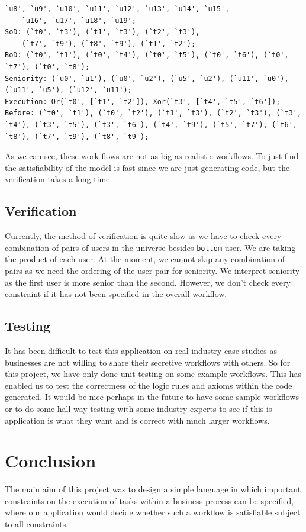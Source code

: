 \documentclass[a4paper]{report}
\begin{document}
\begin{enumerate}
\begin{lstlisting}[frame=single]
	`u8', `u9', `u10', `u11', `u12', `u13', `u14', `u15', 
	`u16', `u17', `u18', `u19'; 
SoD: (`t0', `t3'), (`t1', `t3'), (`t2', `t3'), 
	(`t7', `t9'), (`t8', `t9'), (`t1', `t2');
BoD: (`t0', `t1'), (`t0', `t4'), (`t0', `t5'), (`t0', `t6'), (`t0', `t7'), (`t0', `t8');
Seniority: (`u0', `u1'), (`u0', `u2'), (`u5', `u2'), (`u11', `u0'), (`u11', `u5'), (`u12', `u11');
Execution: Or(`t0', [`t1', `t2']), Xor(`t3', [`t4', `t5', `t6']); 
Before: (`t0', `t1'), (`t0', `t2'), (`t1', `t3'), (`t2', `t3'), (`t3', `t4'), (`t3', `t5'), (`t3', `t6'), (`t4', `t9'), (`t5', `t7'), (`t6', `t8'), (`t7', `t9'), (`t8', `t9');
\end{lstlisting}
\end{enumerate}

As we can see, these work flows are not as big as realistic workflows. To just find the satisfiability of the model is fast since we are just generating code, but the verification takes a long time. \\

\section{Verification}
Currently, the method of verification is quite slow as we have to check every combination of pairs of users in the universe besides \texttt{bottom} user. We are taking the product of each user. At the moment, we cannot skip any combination of pairs as we need the ordering of the user pair for seniority. We interpret seniority as the first user is more senior than the second. However, we don't check every constraint if it has not been specified in the overall workflow.\\

\section{Testing}
It has been difficult to test this application on real industry case studies as businesses are not willing to share their secretive workflows with others. So for this project, we have only done unit testing on some example workflows. This has enabled us to test the correctness of the logic rules and axioms within the code generated. It would be nice perhaps in the future to have some sample workflows or to do some hall way testing with some industry experts to see if this is application is what they want and is correct with much larger workflows.\\

\chapter{Conclusion}
The main aim of this project was to design a simple language in which important constraints on the execution of tasks within a business process can be specified, where our application would decide whether such a workflow is satisfiable subject to all constraints.\\
\end{document}
